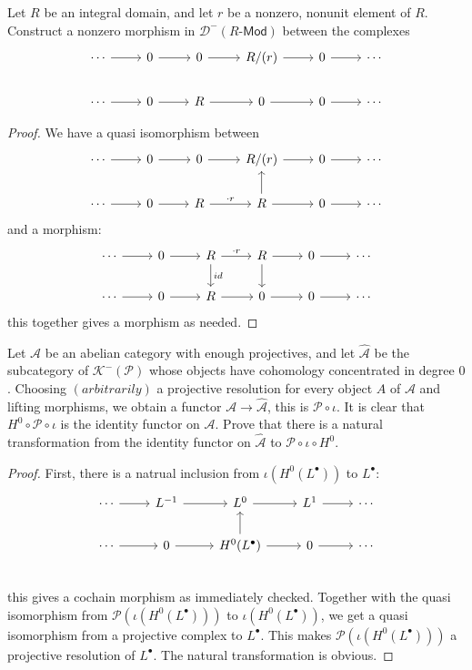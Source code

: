 \begin{exercise}
Let $R$ be an integral domain, and let $r$ be a nonzero, nonunit element of $R$. Construct a nonzero morphism in $\mathcal{D}^-(R\text{-}\mathsf{Mod})$ between the complexes
\[\begin{tikzcd}
\cdots\ar[r]&0\ar[r]&0\ar[r]&R/(r)\ar[r]&0\ar[r]&\cdots\\
\cdots\ar[r]&0\ar[r]&R\ar[r]&0\ar[r]&0\ar[r]&\cdots
\end{tikzcd}\]
\end{exercise}
\begin{proof}
We have a quasi isomorphism between
\[\begin{tikzcd}
\cdots\ar[r]&0\ar[r]&0\ar[r]&R/(r)\ar[r]&0\ar[r]&\cdots\\
\cdots\ar[r]&0\ar[r]&R\ar[r,"\cdot r"]&R\ar[u]\ar[r]&0\ar[r]&\cdots
\end{tikzcd}\]
and a morphism:
\[\begin{tikzcd}
\cdots\ar[r]&0\ar[r]&R\ar[d,"id"]\ar[r,"\cdot r"]&R\ar[d]\ar[r]&0\ar[r]&\cdots\\
\cdots\ar[r]&0\ar[r]&R\ar[r]&0\ar[r]&0\ar[r]&\cdots
\end{tikzcd}\]
this together gives a morphism as needed.
\end{proof}
\begin{exercise}
Let $\mathcal{A}$ be an abelian category with enough projectives, and let $\widehat{\mathcal{A}}$ be the subcategory of $\mathcal{K}^-(\mathcal{P})$ whose objects have cohomology concentrated in degree $0$. Choosing $(arbitrarily)$ a projective resolution for every object $A$ of $\mathcal{A}$ and lifting morphisms, we obtain a functor $\mathcal{A}\to\widehat{\mathcal{A}}$, this is $\mathscr{P}\circ\iota$. It is clear that $H^0\circ\mathscr{P}\circ\iota$ is the identity functor
on $\mathcal{A}$. Prove that there is a natural transformation from the identity functor on $\widehat{\mathcal{A}}$ to $\mathscr{P}\circ\iota\circ H^0$.
\end{exercise}
\begin{proof}
First, there is a natrual inclusion from $\iota(H^0(L^\bullet))$ to $L^\bullet$:
\[\begin{tikzcd}
\cdots\ar[r]&L^{-1}\ar[r]&L^0\ar[r]&L^1\ar[r]&\cdots\\
\cdots\ar[r]&0\ar[r]&H^0(L^\bullet)\ar[u]\ar[r]&0\ar[r]&\cdots\\
\end{tikzcd}\]
this gives a cochain morphism as immediately checked. Together with the quasi isomorphism from $\mathscr{P}(\iota(H^0(L^\bullet)))$ to $\iota(H^0(L^\bullet))$, we get a quasi isomorphism from a projective complex to $L^\bullet$. This makes $\mathscr{P}(\iota(H^0(L^\bullet)))$ a projective resolution of $L^\bullet$. The natural transformation is obvious.
\end{proof}
